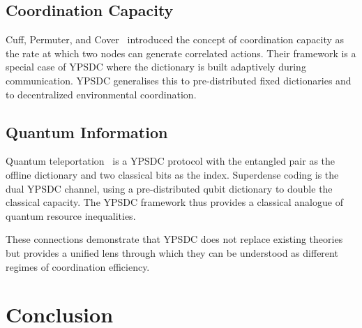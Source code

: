 \documentclass[12pt,a4paper]{article}
\theoremstyle{remark}
\begin{document}
	\subsection*{Coordination Capacity}
	Cuff, Permuter, and Cover~\cite{Cuff2013} introduced the concept of coordination capacity as the rate at which two nodes can generate correlated actions. Their framework is a special case of YPSDC where the dictionary is built adaptively during communication. YPSDC generalises this to pre-distributed fixed dictionaries and to decentralized environmental coordination.
	
	\subsection*{Quantum Information}
	Quantum teleportation~\cite{Bennett1993} is a YPSDC protocol with the entangled pair as the offline dictionary and two classical bits as the index. Superdense coding is the dual YPSDC channel, using a pre-distributed qubit dictionary to double the classical capacity. The YPSDC framework thus provides a classical analogue of quantum resource inequalities.
	
	These connections demonstrate that YPSDC does not replace existing theories but provides a unified lens through which they can be understood as different regimes of coordination efficiency.
	
	\clearpage
	\section{Conclusion}
	
\end{document}
